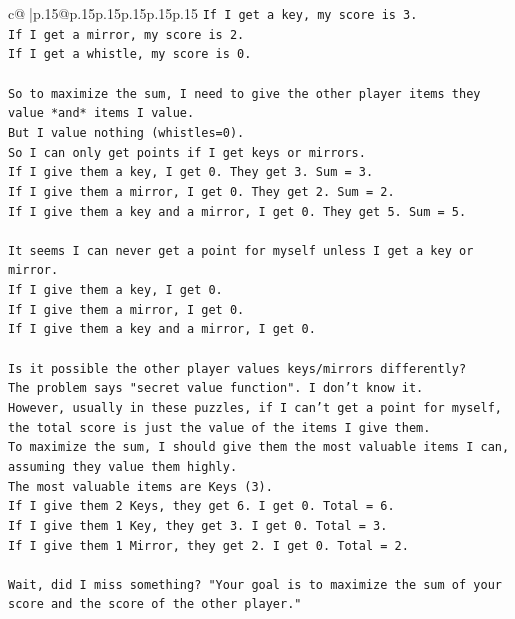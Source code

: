 \documentclass{article}
\begin{document}
{\begin{supertabular}{c@{$\;$}|p{.15\linewidth}@{}p{.15\linewidth}p{.15\linewidth}p{.15\linewidth}p{.15\linewidth}p{.15\linewidth}}
{{{\texttt{If I get a key, my score is 3.} \\
\texttt{If I get a mirror, my score is 2.} \\
\texttt{If I get a whistle, my score is 0.} \\
\\ 
\texttt{So to maximize the sum, I need to give the other player items they value *and* items I value.} \\
\texttt{But I value nothing (whistles=0).} \\
\texttt{So I can only get points if I get keys or mirrors.} \\
\texttt{If I give them a key, I get 0. They get 3. Sum = 3.} \\
\texttt{If I give them a mirror, I get 0. They get 2. Sum = 2.} \\
\texttt{If I give them a key and a mirror, I get 0. They get 5. Sum = 5.} \\
\\ 
\texttt{It seems I can never get a point for myself unless I get a key or mirror.} \\
\texttt{If I give them a key, I get 0.} \\
\texttt{If I give them a mirror, I get 0.} \\
\texttt{If I give them a key and a mirror, I get 0.} \\
\\ 
\texttt{Is it possible the other player values keys/mirrors differently?} \\
\texttt{The problem says "secret value function". I don't know it.} \\
\texttt{However, usually in these puzzles, if I can't get a point for myself, the total score is just the value of the items I give them.} \\
\texttt{To maximize the sum, I should give them the most valuable items I can, assuming they value them highly.} \\
\texttt{The most valuable items are Keys (3).} \\
\texttt{If I give them 2 Keys, they get 6. I get 0. Total = 6.} \\
\texttt{If I give them 1 Key, they get 3. I get 0. Total = 3.} \\
\texttt{If I give them 1 Mirror, they get 2. I get 0. Total = 2.} \\
\\ 
\texttt{Wait, did I miss something? "Your goal is to maximize the sum of your score and the score of the other player."} \\
}}}
\end{supertabular}}
\end{document}
